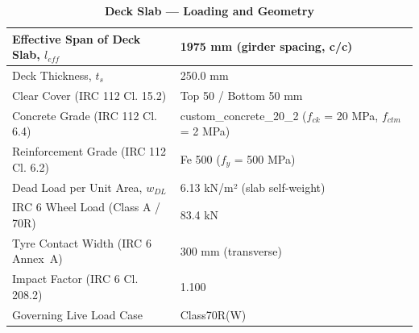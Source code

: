 \documentclass[12pt,a4paper]{report}
\numberwithin{table}{chapter}
\numberwithin{figure}{chapter}
\begin{document}
\vspace{1em}
\begin{longtable}{|L{5.5cm}|p{10.0cm}|}
\caption{\textbf{Deck Slab --- Loading and Geometry}}
\hline
\textnormal{Effective Span of Deck Slab, $l_{eff}$} & 1975 mm (girder spacing, c/c) \\[6pt]
\hline
\textnormal{Deck Thickness, $t_s$} & 250.0 mm \\[6pt]
\hline
\textnormal{Clear Cover (IRC 112 Cl. 15.2)} & Top 50 / Bottom 50 mm \\[6pt]
\hline
\textnormal{Concrete Grade (IRC 112 Cl. 6.4)} & custom\_\allowbreak{}concrete\_\allowbreak{}20\_\allowbreak{}2 ($f_{ck}$ = 20 MPa, $f_{ctm}$ = 2 MPa) \\[6pt]
\hline
\textnormal{Reinforcement Grade (IRC 112 Cl. 6.2)} & Fe 500 ($f_y$ = 500 MPa) \\[6pt]
\hline
\textnormal{Dead Load per Unit Area, $w_{DL}$} & 6.13 kN/m² (slab self-weight) \\[6pt]
\hline
\textnormal{IRC 6 Wheel Load (Class A / 70R)} & 83.4 kN \\[6pt]
\hline
\textnormal{Tyre Contact Width (IRC 6 Annex~A)} & 300 mm (transverse) \\[6pt]
\hline
\textnormal{Impact Factor (IRC 6 Cl. 208.2)} & 1.100 \\[6pt]
\hline
\textnormal{Governing Live Load Case} & Class70R(W) \\[6pt]
\hline
\end{longtable}
\end{document}
